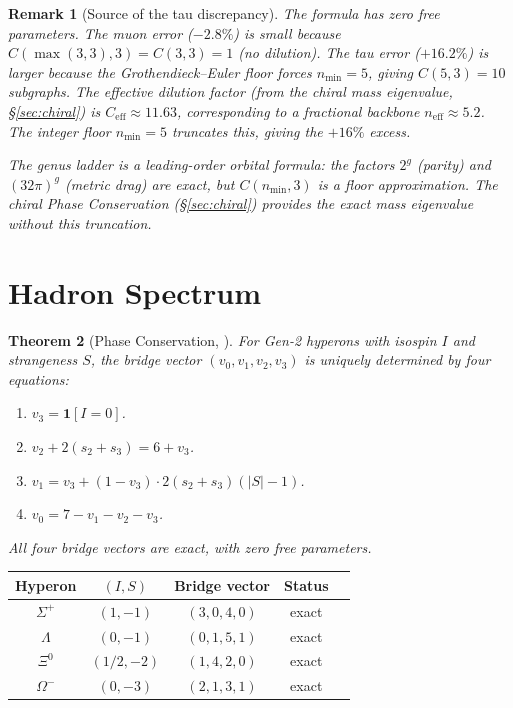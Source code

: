 \documentclass[11pt]{article}
\newtheorem{theorem}{Theorem}[section]
\newtheorem{remark}[theorem]{Remark}
\begin{document}
\begin{remark}[Source of the tau discrepancy]
\label{rem:tau-gap}
The formula has zero free parameters.  The muon error
($-2.8\%$) is small because $C(\max(3,3), 3) = C(3,3) = 1$
(no dilution).  The tau error ($+16.2\%$) is larger because
the Grothendieck--Euler floor forces $n_{\min} = 5$, giving
$C(5,3) = 10$ subgraphs.  The effective dilution factor
(from the chiral mass eigenvalue, \S\ref{sec:chiral}) is
$C_{\mathrm{eff}} \approx 11.63$, corresponding to a
fractional backbone $n_{\mathrm{eff}} \approx 5.2$.  The
integer floor $n_{\min} = 5$ truncates this, giving the
$+16\%$ excess.

The genus ladder is a \emph{leading-order} orbital formula:
the factors $2^g$ (parity) and $(32\pi)^g$ (metric drag)
are exact, but $C(n_{\min}, 3)$ is a floor approximation.
The chiral Phase Conservation (\S\ref{sec:chiral}) provides
the exact mass eigenvalue without this truncation.
\end{remark}

\section{Hadron Spectrum}
\label{sec:hadrons}

\begin{theorem}[Phase Conservation, {\cite[\S11]{SilvaAlvarado26}}]
\label{thm:phase}
For Gen-2 hyperons with isospin $I$ and strangeness $S$,
the bridge vector $(v_0, v_1, v_2, v_3)$ is uniquely
determined by four equations:
\begin{enumerate}
\item[(A)] $v_3 = \mathbf{1}[I = 0]$.
\item[(B)] $v_2 + 2(s_2 + s_3) = 6 + v_3$.
\item[(C)] $v_1 = v_3 + (1 - v_3) \cdot 2(s_2 + s_3)(|S| - 1)$.
\item[(D)] $v_0 = 7 - v_1 - v_2 - v_3$.
\end{enumerate}
All four bridge vectors are exact, with zero free parameters.
\end{theorem}

\begin{center}
\renewcommand{\arraystretch}{1.3}
\begin{tabular}{ccccc}
\toprule
Hyperon & $(I, S)$ & Bridge vector & Status \\
\midrule
$\Sigma^+$ & $(1, -1)$ & $(3, 0, 4, 0)$ & exact \\
$\Lambda$ & $(0, -1)$ & $(0, 1, 5, 1)$ & exact \\
$\Xi^0$ & $(1/2, -2)$ & $(1, 4, 2, 0)$ & exact \\
$\Omega^-$ & $(0, -3)$ & $(2, 1, 3, 1)$ & exact \\
\bottomrule
\end{tabular}
\end{center}
\end{document}
